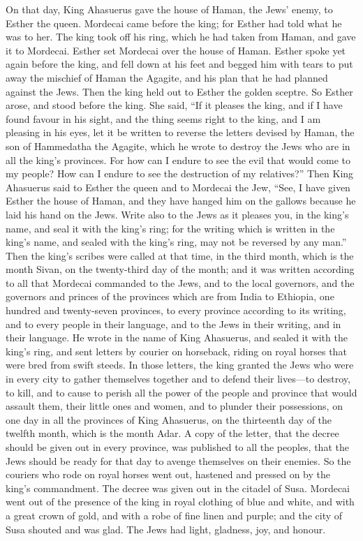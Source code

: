  On that day, King Ahasuerus gave the house of Haman, the
Jews' enemy, to Esther the queen. Mordecai came before the king; for
Esther had told what he was to her.  The king took off his
ring, which he had taken from Haman, and gave it to Mordecai. Esther set
Mordecai over the house of Haman.  Esther spoke yet again
before the king, and fell down at his feet and begged him with tears to
put away the mischief of Haman the Agagite, and his plan that he had
planned against the Jews.  Then the king held out to
Esther the golden sceptre. So Esther arose, and stood before the king.
 She said, ``If it pleases the king, and if I have found
favour in his sight, and the thing seems right to the king, and I am
pleasing in his eyes, let it be written to reverse the letters devised
by Haman, the son of Hammedatha the Agagite, which he wrote to destroy
the Jews who are in all the king's provinces.  For how can
I endure to see the evil that would come to my people? How can I endure
to see the destruction of my relatives?''  Then King
Ahasuerus said to Esther the queen and to Mordecai the Jew, ``See, I
have given Esther the house of Haman, and they have hanged him on the
gallows because he laid his hand on the Jews.  Write also
to the Jews as it pleases you, in the king's name, and seal it with the
king's ring; for the writing which is written in the king's name, and
sealed with the king's ring, may not be reversed by any man.''
 Then the king's scribes were called at that time, in the
third month, which is the month Sivan, on the twenty-third day of the
month; and it was written according to all that Mordecai commanded to
the Jews, and to the local governors, and the governors and princes of
the provinces which are from India to Ethiopia, one hundred and
twenty-seven provinces, to every province according to its writing, and
to every people in their language, and to the Jews in their writing, and
in their language.  He wrote in the name of King
Ahasuerus, and sealed it with the king's ring, and sent letters by
courier on horseback, riding on royal horses that were bred from swift
steeds.  In those letters, the king granted the Jews who
were in every city to gather themselves together and to defend their
lives---to destroy, to kill, and to cause to perish all the power of the
people and province that would assault them, their little ones and
women, and to plunder their possessions,  on one day in
all the provinces of King Ahasuerus, on the thirteenth day of the
twelfth month, which is the month Adar.  A copy of the
letter, that the decree should be given out in every province, was
published to all the peoples, that the Jews should be ready for that day
to avenge themselves on their enemies.  So the couriers
who rode on royal horses went out, hastened and pressed on by the king's
commandment. The decree was given out in the citadel of Susa.
 Mordecai went out of the presence of the king in royal
clothing of blue and white, and with a great crown of gold, and with a
robe of fine linen and purple; and the city of Susa shouted and was
glad.  The Jews had light, gladness, joy, and honour.

